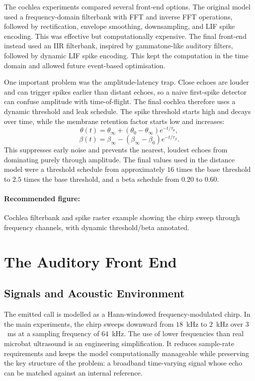 The cochlea experiments compared several front-end options. The original model used a frequency-domain filterbank with FFT and inverse FFT operations, followed by rectification, envelope smoothing, downsampling, and LIF spike encoding. This was effective but computationally expensive. The final front-end instead used an IIR filterbank, inspired by gammatone-like auditory filters, followed by dynamic LIF spike encoding. This kept the computation in the time domain and allowed future event-based optimisation.

One important problem was the amplitude-latency trap. Close echoes are louder and can trigger spikes earlier than distant echoes, so a naive first-spike detector can confuse amplitude with time-of-flight. The final cochlea therefore uses a dynamic threshold and leak schedule. The spike threshold starts high and decays over time, while the membrane retention factor starts low and increases:
\begin{equation}
    \theta(t) = \theta_{\infty} + (\theta_0 - \theta_{\infty})e^{-t/\tau_{\theta}},
\end{equation}
\begin{equation}
    \beta(t) = \beta_{\infty} - (\beta_{\infty}-\beta_0)e^{-t/\tau_{\beta}}.
\end{equation}
This suppresses early noise and prevents the nearest, loudest echoes from dominating purely through amplitude. The final values used in the distance model were a threshold schedule from approximately $16$ times the base threshold to $2.5$ times the base threshold, and a beta schedule from $0.20$ to $0.60$.

\paragraph{Recommended figure:} Cochlea filterbank and spike raster example showing the chirp sweep through frequency channels, with dynamic threshold/beta annotated.


\section{The Auditory Front End}

\subsection{Signals and Acoustic Environment}

The emitted call is modelled as a Hann-windowed frequency-modulated chirp. In the main experiments, the chirp sweeps downward from $18$~kHz to $2$~kHz over $3$~ms at a sampling frequency of $64$~kHz. The use of lower frequencies than real microbat ultrasound is an engineering simplification. It reduces sample-rate requirements and keeps the model computationally manageable while preserving the key structure of the problem: a broadband time-varying signal whose echo can be matched against an internal reference.

